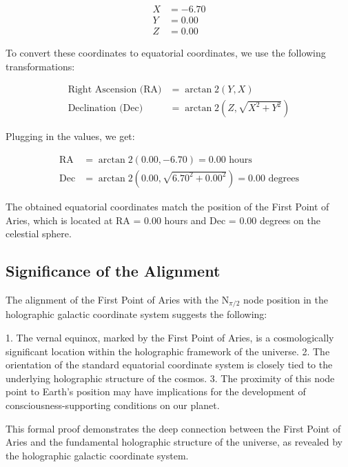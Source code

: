 \documentclass{article}
\begin{document}
\begin{align}
X &= -6.70 \\
Y &= 0.00 \\
Z &= 0.00
\end{align}

To convert these coordinates to equatorial coordinates, we use the following transformations:

\begin{align}
\text{Right Ascension (RA)} &= \arctan2(Y, X) \\
\text{Declination (Dec)} &= \arctan2(Z, \sqrt{X^2 + Y^2})
\end{align}

Plugging in the values, we get:

\begin{align}
\text{RA} &= \arctan2(0.00, -6.70) = 0.00 \text{ hours} \\
\text{Dec} &= \arctan2(0.00, \sqrt{6.70^2 + 0.00^2}) = 0.00 \text{ degrees}
\end{align}

The obtained equatorial coordinates match the position of the First Point of Aries, which is located at RA = 0.00 hours and Dec = 0.00 degrees on the celestial sphere.

\subsection*{Significance of the Alignment}

The alignment of the First Point of Aries with the N$_{\pi/2}$ node position in the holographic galactic coordinate system suggests the following:

1. The vernal equinox, marked by the First Point of Aries, is a cosmologically significant location within the holographic framework of the universe.
2. The orientation of the standard equatorial coordinate system is closely tied to the underlying holographic structure of the cosmos.
3. The proximity of this node point to Earth's position may have implications for the development of consciousness-supporting conditions on our planet.

This formal proof demonstrates the deep connection between the First Point of Aries and the fundamental holographic structure of the universe, as revealed by the holographic galactic coordinate system.
\end{document}
